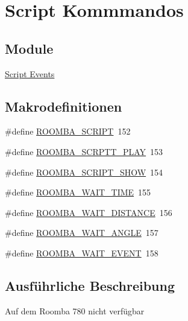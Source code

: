 \hypertarget{group__roomba__commands__script}{\section{Script Kommmandos}
\label{group__roomba__commands__script}
}
\subsection*{Module}
\begin{DoxyCompactItemize}
\item 
\hyperlink{group__roomba__commands__script__events}{Script Events}
\end{DoxyCompactItemize}
\subsection*{Makrodefinitionen}
\begin{DoxyCompactItemize}
\item 
\#define \hyperlink{group__roomba__commands__script_gaedc1545f209e018c642304017cfaf2fd}{R\-O\-O\-M\-B\-A\-\_\-\-S\-C\-R\-I\-P\-T}~152
\item 
\#define \hyperlink{group__roomba__commands__script_ga707a46afb7619d327842a514a710564b}{R\-O\-O\-M\-B\-A\-\_\-\-S\-C\-R\-P\-T\-T\-\_\-\-P\-L\-A\-Y}~153
\item 
\#define \hyperlink{group__roomba__commands__script_gaf2d55738cfa4028ef7e8d2dbf790fb89}{R\-O\-O\-M\-B\-A\-\_\-\-S\-C\-R\-I\-P\-T\-\_\-\-S\-H\-O\-W}~154
\item 
\#define \hyperlink{group__roomba__commands__script_ga4712c8a22bafc8e7104b2a207d9c967b}{R\-O\-O\-M\-B\-A\-\_\-\-W\-A\-I\-T\-\_\-\-T\-I\-M\-E}~155
\item 
\#define \hyperlink{group__roomba__commands__script_ga909e911073bb99a67c67fb879f7f9e33}{R\-O\-O\-M\-B\-A\-\_\-\-W\-A\-I\-T\-\_\-\-D\-I\-S\-T\-A\-N\-C\-E}~156
\item 
\#define \hyperlink{group__roomba__commands__script_ga6f379b056533fe8ed77e7b92018a430b}{R\-O\-O\-M\-B\-A\-\_\-\-W\-A\-I\-T\-\_\-\-A\-N\-G\-L\-E}~157
\item 
\#define \hyperlink{group__roomba__commands__script_gaacbdc16c0a8a665126403d53c976199f}{R\-O\-O\-M\-B\-A\-\_\-\-W\-A\-I\-T\-\_\-\-E\-V\-E\-N\-T}~158
\end{DoxyCompactItemize}


\subsection{Ausführliche Beschreibung}
Auf dem Roomba 780 nicht verfügbar 

